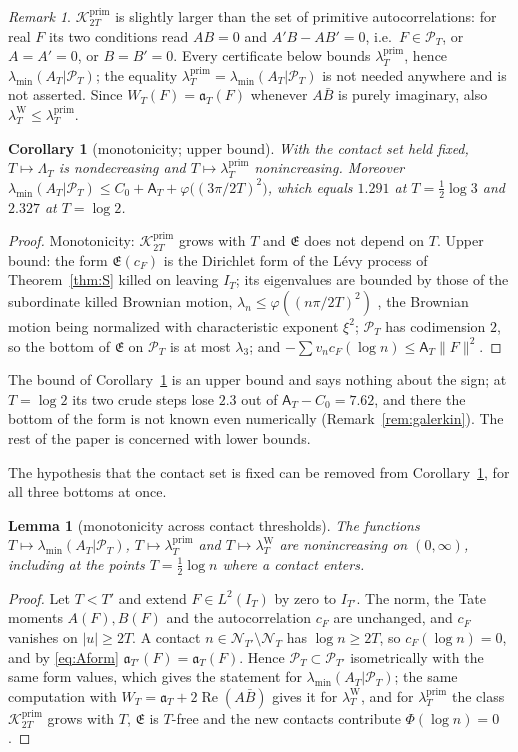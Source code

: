 \documentclass[11pt]{amsart}
\newtheorem{lemma}[theorem]{Lemma}
\newtheorem{corollary}[theorem]{Corollary}
\theoremstyle{definition}
\theoremstyle{remark}
\newtheorem{remark}[theorem]{Remark}
\newcommand{\Rel}{\operatorname{Re}}
\newcommand{\Kp}{\mathcal K^{\mathrm{prim}}_{2T}}
\newcommand{\PT}{\mathcal P_T}
\newcommand{\IT}{I_T}
\newcommand{\lamP}{\lambda^{\mathrm{prim}}_T}
\newcommand{\lamW}{\lambda^{\mathrm W}_T}
\newcommand{\lamA}{\lambda_{\min}(A_T|\PT)}
\newcommand{\cF}{c_F}
\newcommand{\Lev}{\mathfrak E}
\newcommand{\NT}{\mathcal N_T}
\newcommand{\Aconst}{\mathsf A_T}
\begin{document}
\begin{remark}\label{rem:Kprim}
$\Kp$ is slightly larger than the set of primitive autocorrelations: for real $F$ its two
conditions read $AB=0$ and $A'B-AB'=0$, i.e.\ $F\in\PT$, or $A=A'=0$, or $B=B'=0$. Every
certificate below bounds $\lamP$, hence $\lamA$; the equality $\lamP=\lamA$ is not needed
anywhere and is not asserted. Since $W_T(F)=\mathfrak a_T(F)$ whenever $A\bar B$ is purely
imaginary, also $\lamW\le\lamP$.
\end{remark}

\begin{corollary}[monotonicity; upper bound]\label{cor:mono}
With the contact set held fixed, $T\mapsto\Lambda_T$ is nondecreasing and $T\mapsto\lamP$
nonincreasing. Moreover
$\lamA\le C_0+\Aconst+\varphi\big((3\pi/2T)^2\big)$, which equals $1.291$ at $T=\frac12\log3$ and
$2.327$ at $T=\log 2$.
\end{corollary}
\begin{proof}
Monotonicity: $\Kp$ grows with $T$ and $\Lev$ does not depend on $T$. Upper bound: the form
$\Lev(\cF)$ is the Dirichlet form of the L\'evy process of Theorem~\ref{thm:S} killed on
leaving $\IT$; its eigenvalues are bounded by those of the subordinate killed Brownian motion,
$\lambda_n\le\varphi((n\pi/2T)^2)$ \cite[Prop.~2.3]{SongVondracek2003}, the Brownian motion being
normalized with characteristic exponent $\xi^2$; $\PT$ has codimension
$2$, so the bottom of $\Lev$ on $\PT$ is at most $\lambda_3$; and $-\sum v_n\cF(\log n)\le\Aconst\|F\|^2$.
\end{proof}

The bound of Corollary~\ref{cor:mono} is an upper bound and says nothing about the sign; at
$T=\log2$ its two crude steps lose $2.3$ out of $\Aconst-C_0=7.62$, and there the bottom of the form
is not known even numerically (Remark~\ref{rem:galerkin}). The rest of the paper is concerned with
lower bounds.

The hypothesis that the contact set is fixed can be removed from Corollary~\ref{cor:mono}, for
all three bottoms at once.

\begin{lemma}[monotonicity across contact thresholds]\label{lem:monoT}
The functions $T\mapsto\lamA$, $T\mapsto\lamP$ and $T\mapsto\lamW$ are nonincreasing on $(0,\infty)$,
including at the points $T=\frac12\log n$ where a contact enters.
\end{lemma}
\begin{proof}
Let $T<T'$ and extend $F\in L^2(\IT)$ by zero to $I_{T'}$. The norm, the Tate moments $A(F),B(F)$ and
the autocorrelation $\cF$ are unchanged, and $\cF$ vanishes on $|u|\ge2T$. A contact
$n\in\mathcal N_{T'}\setminus\NT$ has $\log n\ge2T$, so $\cF(\log n)=0$, and by \eqref{eq:Aform}
$\mathfrak a_{T'}(F)=\mathfrak a_T(F)$. Hence $\PT\subset\mathcal P_{T'}$ isometrically with the same
form values, which gives the statement for $\lamA$; the same computation with $W_T=\mathfrak a_T+2\Rel(A\bar B)$
gives it for $\lamW$, and for $\lamP$ the class $\Kp$ grows with $T$, $\Lev$ is $T$-free and the new
contacts contribute $\Phi(\log n)=0$.
\end{proof}
\end{document}
